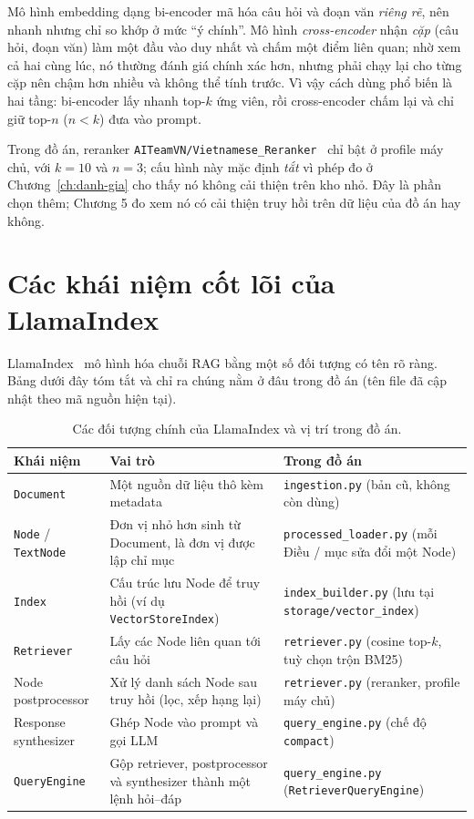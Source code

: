 Mô hình embedding dạng bi-encoder mã hóa câu hỏi và đoạn văn \emph{riêng rẽ}, nên nhanh nhưng chỉ so khớp ở mức ``ý chính''. Mô hình \emph{cross-encoder} nhận \emph{cặp} (câu hỏi, đoạn văn) làm một đầu vào duy nhất và chấm một điểm liên quan; nhờ xem cả hai cùng lúc, nó thường đánh giá chính xác hơn, nhưng phải chạy lại cho từng cặp nên chậm hơn nhiều và không thể tính trước. Vì vậy cách dùng phổ biến là hai tầng: bi-encoder lấy nhanh top-$k$ ứng viên, rồi cross-encoder chấm lại và chỉ giữ top-$n$ ($n<k$) đưa vào prompt.

Trong đồ án, reranker \texttt{AITeamVN/Vietnamese\_Reranker}~\cite{vietnamesereranker} chỉ bật ở profile máy chủ, với $k=10$ và $n=3$; cấu hình này mặc định \emph{tắt} vì phép đo ở Chương~\ref{ch:danh-gia} cho thấy nó không cải thiện trên kho nhỏ. Đây là phần chọn thêm; Chương 5 đo xem nó có cải thiện truy hồi trên dữ liệu của đồ án hay không.

\section{Các khái niệm cốt lõi của LlamaIndex}

LlamaIndex~\cite{llamaindex2025docs} mô hình hóa chuỗi RAG bằng một số đối tượng có tên rõ ràng. Bảng dưới đây tóm tắt và chỉ ra chúng nằm ở đâu trong đồ án (tên file đã cập nhật theo mã nguồn hiện tại).

\begin{table}[H]
  \centering
  \small
  \begin{tabularx}{\textwidth}{l X X}
    \toprule
    \textbf{Khái niệm} & \textbf{Vai trò} & \textbf{Trong đồ án} \\
    \midrule
    \texttt{Document} & Một nguồn dữ liệu thô kèm metadata & \texttt{ingestion.py} (bản cũ, không còn dùng) \\
    \texttt{Node} / \texttt{TextNode} & Đơn vị nhỏ hơn sinh từ Document, là đơn vị được lập chỉ mục & \texttt{processed\_loader.py} (mỗi Điều / mục sửa đổi một Node) \\
    \texttt{Index} & Cấu trúc lưu Node để truy hồi (ví dụ \texttt{VectorStoreIndex}) & \texttt{index\_builder.py} (lưu tại \texttt{storage/vector\_index}) \\
    \texttt{Retriever} & Lấy các Node liên quan tới câu hỏi & \texttt{retriever.py} (cosine top-$k$, tuỳ chọn trộn BM25) \\
    Node postprocessor & Xử lý danh sách Node sau truy hồi (lọc, xếp hạng lại) & \texttt{retriever.py} (reranker, profile máy chủ) \\
    Response synthesizer & Ghép Node vào prompt và gọi LLM & \texttt{query\_engine.py} (chế độ \texttt{compact}) \\
    \texttt{QueryEngine} & Gộp retriever, postprocessor và synthesizer thành một lệnh hỏi--đáp & \texttt{query\_engine.py} (\texttt{RetrieverQueryEngine}) \\
    \bottomrule
  \end{tabularx}
  \caption{Các đối tượng chính của LlamaIndex và vị trí trong đồ án.}
\end{table}

